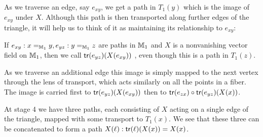 As we traverse an edge, say \( e_{xy} \), we get a path in \( T_1(y) \) which is the image of \( e_{xy} \) under \( X \). Although this path is then transported along further edges of the triangle, it will help us to think of it as maintaining its relationship to \( e_{xy} \):

\begin{mydef}
If \( e_{xy}:x=_{\mathbb{M}_1} y, e_{yz}:y=_{\mathbb{M}_1}z \) are paths in \( \mathbb{M}_1 \) and \( X \) is a nonvanishing vector field on \( \mathbb{M}_1 \), then we call \( \mathsf{tr}(e_{yz})(X(e_{xy})) \) , even though this is a path in \( T_1(z) \).
\end{mydef}

As we traverse an additional edge this image is simply mapped to the next vertex through the lens of transport, which acts similarly on all the points in a fiber. The image is carried first to \( \mathsf{tr}(e_{yz})(X(e_{xy})) \) then to \( \mathsf{tr}(e_{zx})\circ\mathsf{tr}(e_{yz})(X(x)) \).

At stage 4 we have three paths, each consisting of \( X \) acting on a single edge of the triangle, mapped with some transport to \( T_1(x) \). We see that these three can be concatenated to form a path \( X(\ell):\mathsf{tr}(\ell)(X(x))=X(x) \).

